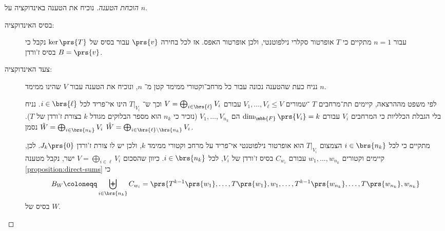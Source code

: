 \documentclass[a4paper,10pt,twoside,openany]{article}
\begin{document}
\begin{proof}[הוכחת הטענה]
נוכיח את הטענה באינדוקציה על
$n$.

\begin{description}
\item[בסיס האינדוקציה:]

עבור
$n = 1$
מתקיים כי $T$ אופרטור סקלרי נילפוטנטי, ולכן אופרטור האפס. אז לכל בחירה $\prs{v}$ עבור בסיס של
$\ker\prs{T}$
נקבל כי
$B = \prs{v}$
בסיס ז'ורדן.

\item[צעד האינדוקציה:]

נניח כעת שהטענה נכונה עבור כל מרחב־וקטורי ממימד קטן מ־%
$n$,
ונוכיח את הטענה עבור
$V$
שהינו ממימד
$n$.

לפי משפט מההרצאה, קיימים תת־מרחבים
$T$%
־שמורים
$V_1, \ldots, V_\ell \leq V$
עבורם
$V = \bigoplus_{i \in \brs{\ell}} V_i$
וכך ש־%
$T|_{V_i}$
הינו אי־פריד לכל
$i \in \brs{\ell}$.
נניח בלי הגבלת הכלליות כי המרחבים
$V_i$
עבורם
$\dim_{\mbb{F}}\prs{V_i} = k$
הם
$V_1, \ldots, V_{n_k}$
(נזכיר כי
$n_k$
הוא מספר הבלוקים מגודל
$k$
בצורת ז'ורדן של
$T$).
נסמן
$\tilde{W} = \bigoplus_{i \in \brs{n_k}} V_i$
$\hat{W} = \bigoplus_{i \in \brs{\ell} \setminus \brs{n_k}} V_i$.

מתקיים כי לכל
$i \in \brs{n_k}$
הצמצום
$T|_{V_i}$
הוא אופרטור נילפוטנטי אי־פריד על מרחב וקטורי ממימד
$k$,
ולכן יש לו צורת ז'ורדן
$J_k\prs{0}$.
לכן, קיימים וקטורים
$w_1, \ldots, w_{n_k}$
עבורם
$C_{w_i}$
בסיס ז'ורדן של
$V_i$,
לכל
$i \in \brs{n_k}$.
כיוון שהסכום
$V = \bigoplus_{i \in \ell} V_i$
ישר, נקבל מטענה
\ref{proposition:direct-sums}
כי
\[B_W \coloneqq \biguplus_{i \in \brs{n_k}} C_{w_i} = \prs{T^{k-1}\prs{w_1}, \ldots, T\prs{w_1}, w_1, \ldots, T^{k-1}\prs{w_{n_k}}, \ldots, T\prs{w_{n_k}}, w_{n_k}}\]
בסיס של
$W$.
\end{description}
\end{proof}
\end{document}
